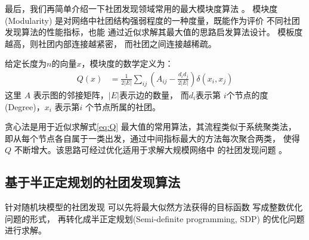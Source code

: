最后，我们再简单介绍一下社团发现领域常用的最大模块度算法
\cite{newman2006modularity}。
模块度 (Modularity)
是对网络中社团结构强弱程度的一种度量，既能作为评价
不同社团发现算法的性能指标，也能
通过近似求解其最大值的思路启发算法设计。
模板度越高，则社团内部连接越紧密，
而社团之间连接越稀疏。

给定长度为$n$的向量$x$，模块度的数学定义为：
\begin{align}\label{eq:Q}
  Q(x) &= \frac{1}{2 |E|} \sum_{ij} 
  \left(A_{ij} - \frac{d_i d_j}{2 |E|} \right) \delta(x_i, x_j)
\end{align}
这里 $A$ 表示图的邻接矩阵，$|E|$表示边的数量，
而$d_i$表示第
$i$个节点的度(Degree)，$x_i$ 表示第$i$
个节点所属的社团。

贪心法是用于近似求解式\eqref{eq:Q}
最大值的常用算法，其流程类似于系统聚类法，
即从每个节点各自属于一类出发，通过中间指标最大的方法每次聚合两类，
使得 $Q$ 不断增大。该思路可经过优化适用于求解大规模网络中
的社团发现问题 \cite{clauset2004finding}。

\subsection{基于半正定规划的社团发现算法}

针对随机块模型的社团发现
可以先将最大似然方法获得的目标函数
写成整数优化问题的形式，
再转化成半正定规划(Semi-definite programming, SDP) 的优化问题进行求解。

